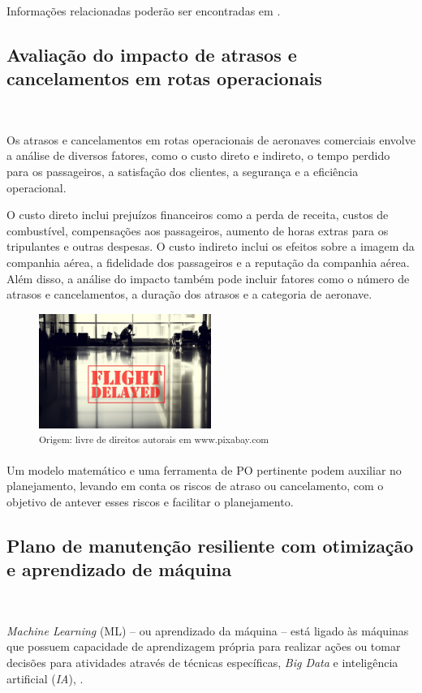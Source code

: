 \documentclass{abntex2}
\begin{document}
\begin{sloppypar}
Informações relacionadas poderão ser encontradas em \cite{DuncanMarquesGuilhermeMartinetti:2005}.

\subsection{Avaliação do impacto de atrasos e cancelamentos em rotas operacionais}\

Os atrasos e cancelamentos em rotas operacionais de aeronaves comerciais envolve a análise de diversos fatores, como o custo direto e indireto, o tempo perdido para os passageiros, a satisfação dos clientes, a segurança e a eficiência operacional.

O custo direto inclui prejuízos financeiros como a perda de receita, custos de combustível, compensações aos passageiros, aumento de horas extras para os tripulantes e outras despesas. O custo indireto inclui os efeitos sobre a imagem da companhia aérea, a fidelidade dos passageiros e a reputação da companhia aérea. Além disso, a análise do impacto também pode incluir fatores como o número de atrasos e cancelamentos, a duração dos atrasos e a categoria de aeronave.

\begin{figure}[h]
	\centering
	\includegraphics[width=0.5\textwidth]{Images/flight_delay.jpg}\\
	\small\textsuperscript{Origem: livre de direitos autorais em www.pixabay.com}
\end{figure}

Um modelo matemático e uma ferramenta de PO pertinente podem auxiliar no planejamento, levando em conta os riscos de atraso ou cancelamento, com o objetivo de antever esses riscos e facilitar o planejamento.

\subsection{Plano de manutenção resiliente com otimização e aprendizado de máquina}\

\textit{Machine Learning} (ML) – ou aprendizado da máquina – está ligado às máquinas que possuem capacidade de aprendizagem própria para realizar ações ou tomar decisões para atividades através de técnicas específicas, \textit{Big Data} e inteligência artificial (\textit{IA}), \cite{Mitchell:1997}.  


\end{sloppypar}
\end{document}
